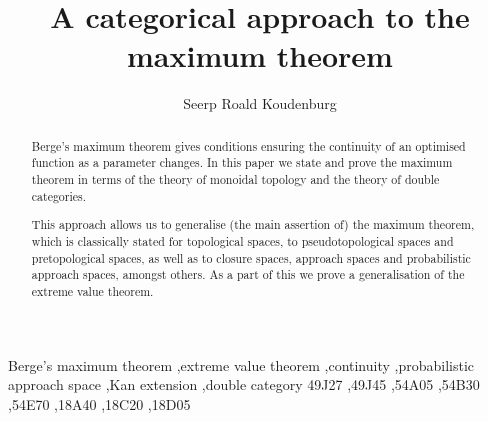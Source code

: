 \documentclass[preprint, a4paper]{elsarticle}
\theoremstyle{definition}
\theoremstyle{remark}
\providecommand{\2}{\mathsf 2}
\begin{document}
	\title{A categorical approach to the maximum theorem}
	\author{Seerp Roald Koudenburg}
	\address{Mathematics Research and Teaching Group\\Middle East Technical University, Northern Cyprus Campus\\ 99738 Kalkanl\i, G\"uzelyurt, TRNC, via Mersin 10, Turkey}
	\begin{abstract}
		Berge's maximum theorem gives conditions ensuring the continuity of an optimised function as a parameter changes. In this paper we state and prove the maximum theorem in terms of the theory of monoidal topology and the theory of double categories.
		
		This approach allows us to generalise (the main assertion of) the maximum theorem, which is classically stated for topological spaces, to pseudotopological spaces and pretopological spaces, as well as to closure spaces, approach spaces and probabilistic approach spaces, amongst others. As a part of this we prove a generalisation of the extreme value theorem.
	\end{abstract}
	\begin{keyword}
		Berge's maximum theorem \sep extreme value theorem \sep continuity \sep probabilistic approach space \sep Kan extension \sep double category
		\MSC[2010] 49J27 \sep 49J45 \sep 54A05 \sep 54B30 \sep 54E70 \sep 18A40 \sep 18C20 \sep 18D05
	\end{keyword}
	\maketitle
	
	\setcounter{section}{-1} %
\end{document}

